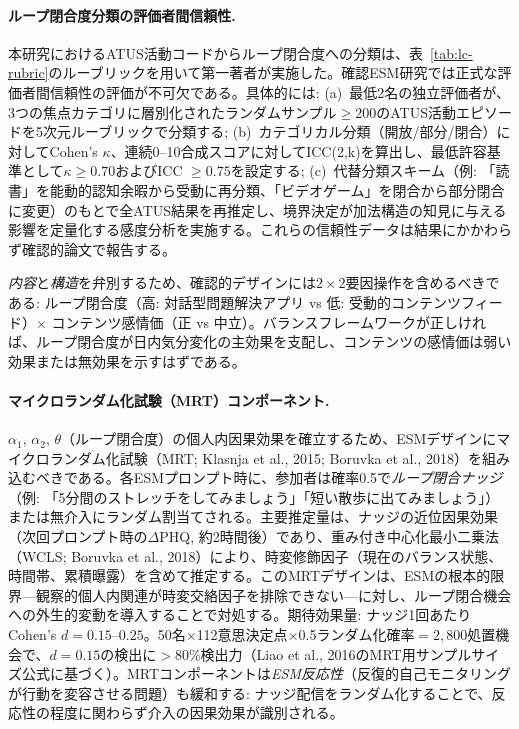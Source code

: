\documentclass[a4paper,11pt,titlepage]{article}
\begin{document}
\paragraph{ループ閉合度分類の評価者間信頼性.}
本研究におけるATUS活動コードからループ閉合度への分類は、表~\ref{tab:lc-rubric}のルーブリックを用いて第一著者が実施した。確認ESM研究では正式な評価者間信頼性の評価が不可欠である。具体的には: (a)~最低2名の独立評価者が、3つの焦点カテゴリに層別化されたランダムサンプル$\geq 200$のATUS活動エピソードを5次元ルーブリックで分類する; (b)~カテゴリカル分類（開放/部分/閉合）に対してCohen's $\kappa$、連続0--10合成スコアに対してICC(2,k)を算出し、最低許容基準として$\kappa \geq 0.70$およびICC $\geq 0.75$を設定する; (c)~代替分類スキーム（例: 「読書」を能動的認知余暇から受動に再分類、「ビデオゲーム」を閉合から部分閉合に変更）のもとで全ATUS結果を再推定し、境界決定が加法構造の知見に与える影響を定量化する感度分析を実施する。これらの信頼性データは結果にかかわらず確認的論文で報告する。

\emph{内容}と\emph{構造}を弁別するため、確認的デザインには$2 \times 2$要因操作を含めるべきである: ループ閉合度（高: 対話型問題解決アプリ vs 低: 受動的コンテンツフィード）$\times$ コンテンツ感情価（正 vs 中立）。バランスフレームワークが正しければ、ループ閉合度が日内気分変化の主効果を支配し、コンテンツの感情価は弱い効果または無効果を示すはずである。

\paragraph{マイクロランダム化試験（MRT）コンポーネント.}
$\alpha_1$, $\alpha_2$, $\theta$（ループ閉合度）の個人内因果効果を確立するため、ESMデザインにマイクロランダム化試験（MRT; Klasnja et al., 2015; Boruvka et al., 2018）を組み込むべきである。各ESMプロンプト時に、参加者は確率0.5で\textit{ループ閉合ナッジ}（例: 「5分間のストレッチをしてみましょう」「短い散歩に出てみましょう」）または無介入にランダム割当てされる。主要推定量は、ナッジの近位因果効果（次回プロンプト時の$\Delta$PHQ, 約2時間後）であり、重み付き中心化最小二乗法（WCLS; Boruvka et al., 2018）により、時変修飾因子（現在のバランス状態、時間帯、累積曝露）を含めて推定する。このMRTデザインは、ESMの根本的限界---観察的個人内関連が時変交絡因子を排除できない---に対し、ループ閉合機会への外生的変動を導入することで対処する。期待効果量: ナッジ1回あたりCohen's $d = 0.15$--$0.25$。50名$\times$112意思決定点$\times$0.5ランダム化確率$= 2{,}800$処置機会で、$d = 0.15$の検出に$>$80\%検出力（Liao et al., 2016のMRT用サンプルサイズ公式に基づく）。MRTコンポーネントは\textit{ESM反応性}（反復的自己モニタリングが行動を変容させる問題）も緩和する: ナッジ配信をランダム化することで、反応性の程度に関わらず介入の因果効果が識別される。
\end{document}
